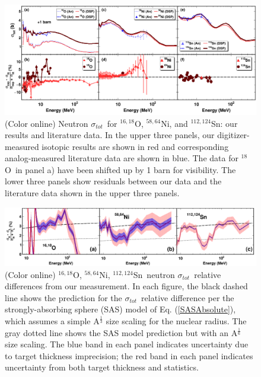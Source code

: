 \documentclass[twocolumn,secnumarabic,amssymb, nobibnotes, aps, prl,
superscriptaddress, nobalancelastpage]{revtex4}
\newcommand{\tot}{\ensuremath{\sigma_{tot}}}
\newcommand{\oEight}{\ensuremath{^{18}}O}
\newcommand{\oSixEight}{\ensuremath{^{16,18}}O}
\newcommand{\niEightFour}{\ensuremath{^{58,64}}N\lowercase{i}}
\newcommand{\snTwelveFour}{\ensuremath{^{112,124}}S\lowercase{n}}
\begin{document}
\begin{figure}[tb]
    \centering
    \includegraphics[width=\textwidth]{figures/SixPanel.png}
    \caption[Neutron \tot\ for \oSixEight, \niEightFour, and \snTwelveFour: our results and literature data]
    {(Color online) Neutron \tot\ for \oSixEight, \niEightFour, and \snTwelveFour: our results 
        and literature data.  In the upper three panels, our digitizer-measured
        isotopic results are shown in red and
        corresponding analog-measured literature data \cite{Finlay1993, 
        Perey1972, Vaughn1965, Salisbury1965, Perey1993, Dukarevich1967,
        Harper1982, Timokhov1989, Rapaport1980} are shown in blue.
        The data for \oEight\ in panel a) have been
        shifted up by 1 barn for visibility.
        The lower three panels show residuals between our data and the
        literature data shown in the upper three panels.
    }
    \label{SixPanel}
\end{figure}
\begin{figure}[tb]
    \centering
    \includegraphics[width=\textwidth]{figures/ThreePanelRelDiff.png}
    \caption[\oSixEight, \niEightFour, \snTwelveFour\ neutron \tot\ relative difference]
    {
        (Color online) \oSixEight, \niEightFour, \snTwelveFour\ neutron \tot\ relative differences
        from our measurement. In each figure, the black dashed line shows the 
        prediction for the \tot\ relative difference per the strongly-absorbing 
        sphere (SAS) model of Eq. (\ref{SASAbsolute}), which assumes a simple 
        A$^{\frac{1}{3}}$ size scaling for the nuclear radius.
        The gray dotted line shows the
        SAS model prediction but with an
        A$^{\frac{1}{6}}$ size scaling. The blue band in each panel indicates
        uncertainty due to target thickness imprecision;
        the red band in each panel
        indicates uncertainty from both target thickness and statistics.
    }
    \label{ThreePanelRelDiff}
\end{figure}
\end{document}
